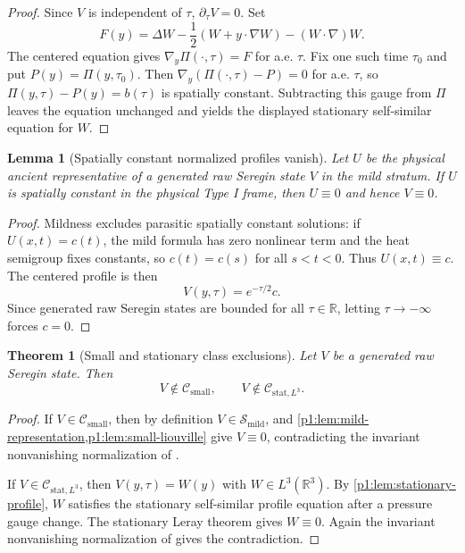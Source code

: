 \documentclass[11pt]{amsart}
\theoremstyle{plain}
\newtheorem{theorem}{Theorem}[section]
\newtheorem{lemma}[lemma]{Lemma}
\theoremstyle{definition}
\theoremstyle{remark}
\numberwithin{equation}{section}
\newcommand{\R}{\mathbb R}
\newcommand{\calS}{\mathcal S}
\newcommand{\calC}{\mathcal C}
\begin{document}
\begin{proof}
Since \(V\) is independent of \(\tau\), \(\partial_\tau V=0\).  Set
\[
   F(y)=
   \Delta W-\frac12(W+y\cdot\nabla W)-(W\cdot\nabla)W .
\]
The centered equation gives \(\nabla_y\Pi(\cdot,\tau)=F\) for a.e. \(\tau\).
Fix one such time \(\tau_0\) and put \(P(y)=\Pi(y,\tau_0)\).  Then
\(\nabla_y(\Pi(\cdot,\tau)-P)=0\) for a.e. \(\tau\), so
\(\Pi(y,\tau)-P(y)=b(\tau)\) is spatially constant.  Subtracting this gauge
from \(\Pi\) leaves the equation unchanged and yields the displayed
stationary self-similar equation for \(W\).
\end{proof}

\begin{lemma}[Spatially constant normalized profiles vanish]
\label{p1:lem:galilean-trivial-zero}
Let \(U\) be the physical ancient representative of a generated raw Seregin
state \(V\) in the mild stratum.  If \(U\) is spatially constant in the
physical Type I frame, then \(U\equiv0\) and hence \(V\equiv0\).
\end{lemma}

\begin{proof}
Mildness excludes parasitic spatially constant solutions: if
\(U(x,t)=c(t)\), the mild formula has zero nonlinear term and the heat
semigroup fixes constants, so \(c(t)=c(s)\) for all \(s<t<0\).  Thus
\(U(x,t)\equiv c\).  The centered profile is then
\[
   V(y,\tau)=e^{-\tau/2}c .
\]
Since generated raw Seregin states are bounded for all \(\tau\in\R\),
letting \(\tau\to-\infty\) forces \(c=0\).
\end{proof}

\begin{theorem}[Small and stationary class exclusions]
\label{p1:thm:classical-classes}
Let \(V\) be a generated raw Seregin state.  Then
\[
   V\notin \calC_{\mathrm{small}},
   \qquad
   V\notin \calC_{\mathrm{stat},L^3}.
\]
\end{theorem}

\begin{proof}
If \(V\in\calC_{\mathrm{small}}\), then
by definition \(V\in\calS_{\mathrm{mild}}\), and
\cref{p1:lem:mild-representation,p1:lem:small-liouville} give \(V\equiv0\),
contradicting the invariant nonvanishing normalization of
.

If \(V\in\calC_{\mathrm{stat},L^3}\), then
\(V(y,\tau)=W(y)\) with \(W\in L^3(\R^3)\).  By
\cref{p1:lem:stationary-profile}, \(W\) satisfies the stationary self-similar
profile equation after a pressure gauge change.
The stationary Leray theorem  gives \(W\equiv0\).  Again
the invariant nonvanishing normalization of 
gives the contradiction.
\end{proof}
\end{document}
